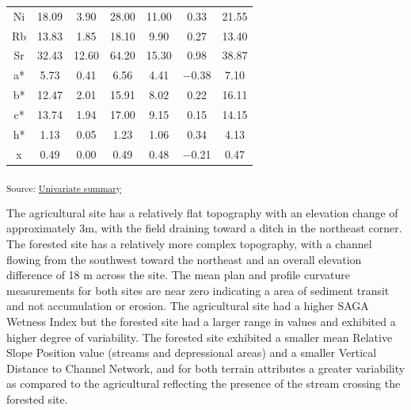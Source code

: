 \documentclass[
  number]{elsarticle}
\begin{document}
\begin{longtable}[]{@{}ccccccc@{}}
Ni & 18.09 & 3.90 & 28.00 & 11.00 & 0.33 & 21.55 \\
Rb & 13.83 & 1.85 & 18.10 & 9.90 & 0.27 & 13.40 \\
Sr & 32.43 & 12.60 & 64.20 & 15.30 & 0.98 & 38.87 \\
a* & 5.73 & 0.41 & 6.56 & 4.41 & −0.38 & 7.10 \\
b* & 12.47 & 2.01 & 15.91 & 8.02 & 0.22 & 16.11 \\
c* & 13.74 & 1.94 & 17.00 & 9.15 & 0.15 & 14.15 \\
h* & 1.13 & 0.05 & 1.23 & 1.06 & 0.34 & 4.13 \\
x & 0.49 & 0.00 & 0.49 & 0.48 & −0.21 & 0.47 \\

\end{longtable}

\textsubscript{Source:
\href{https://alex-koiter.github.io/spatial-variability-soil-manuscript/notebooks/univariate_summary.qmd.html\#cell-tbl-univariate-summary}{Univariate
summary}}

The agricultural site has a relatively flat topography with an elevation
change of approximately 3m, with the field draining toward a ditch in
the northeast corner. The forested site has a relatively more complex
topography, with a channel flowing from the southwest toward the
northeast and an overall elevation difference of 18 m across the site.
The mean plan and profile curvature measurements for both sites are near
zero indicating a area of sediment transit and not accumulation or
erosion. The agricultural site had a higher SAGA Wetness Index but the
forested site had a larger range in values and exhibited a higher degree
of variability. The forested site exhibited a smaller mean Relative
Slope Position value (streams and depressional areas) and a smaller
Vertical Distance to Channel Network, and for both terrain attributes a
greater variability as compared to the agricultural reflecting the
presence of the stream crossing the forested site.
\end{document}

